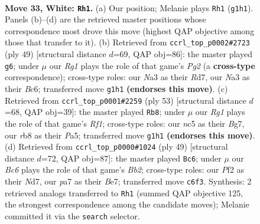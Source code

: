 \documentclass[11pt]{article}
\begin{document}
\clearpage

\begin{figure}[p]\centering
\begin{subfigure}{0.46\textwidth}\centering
\resizebox{\linewidth}{!}{%
\newchessgame
\chessboard[
  setfen={1r3r2/p4p1k/bpB1p1pp/2n5/2P5/N1B1P2P/PR3PP1/5KR1 w - - 11 33},
  showmover=false,
  pgfstyle=straightmove, color=movearrow, markmove={g1-h1}
]}
\caption{}
\end{subfigure}\hfill
\begin{subfigure}{0.46\textwidth}\centering
\resizebox{\linewidth}{!}{%
\newchessgame
\chessboard[
  setfen={1r3k2/3r1pp1/2b2n2/p1pp3p/5P1P/P1N1P3/1P1R1PB1/2R3K1 b - - 1 25},
  showmover=false,
  pgfstyle=straightmove, color=movearrow, markmove={g7-g6}
]}
\caption{}
\end{subfigure}
\\[4pt]
\begin{subfigure}{0.46\textwidth}\centering
\resizebox{\linewidth}{!}{%
\newchessgame
\chessboard[
  setfen={5rk1/4ppbp/6p1/pN1n4/P2P3P/BR4P1/4rPK1/2R5 b - - 1 27},
  showmover=false,
  pgfstyle=straightmove, color=movearrow, markmove={f8-b8}
]}
\caption{}
\end{subfigure}\hfill
\begin{subfigure}{0.46\textwidth}\centering
\resizebox{\linewidth}{!}{%
\newchessgame
\chessboard[
  setfen={r7/1b1nbpkp/4p1p1/p2p4/1r1P4/2N1P1P1/1P2BP1P/RR2N1K1 b - - 1 25},
  showmover=false,
  pgfstyle=straightmove, color=movearrow, markmove={b7-c6}
]}
\caption{}
\end{subfigure}
\caption{\textbf{Move 33, White: \texttt{Rh1}.} (a) Our position; Melanie plays \texttt{Rh1} (\texttt{g1h1}). Panels (b)--(d) are the retrieved master positions whose correspondence most drove this move (highest QAP objective among those that transfer to it). (b) Retrieved from \texttt{ccrl\_top\_p0002\#2723} (ply 49) [structural distance $d$=69, QAP obj=86]: the master played \texttt{g6}; under $\mu$ our \emph{Rg1} plays the role of that game's \emph{Pg2} (a \textbf{cross-type} correspondence); cross-type roles: our \emph{N}a3 as their \emph{R}d7, our \emph{N}a3 as their \emph{B}c6; transferred move \texttt{g1h1} \textbf{(endorses this move)}. (c) Retrieved from \texttt{ccrl\_top\_p0001\#2259} (ply 53) [structural distance $d$=68, QAP obj=39]: the master played \texttt{Rb8}; under $\mu$ our \emph{Rg1} plays the role of that game's \emph{Rf1}; cross-type roles: our \emph{n}c5 as their \emph{B}g7, our \emph{r}b8 as their \emph{P}a5; transferred move \texttt{g1h1} \textbf{(endorses this move)}. (d) Retrieved from \texttt{ccrl\_top\_p0000\#1024} (ply 49) [structural distance $d$=72, QAP obj=87]: the master played \texttt{Bc6}; under $\mu$ our \emph{Bc6} plays the role of that game's \emph{Bb2}; cross-type roles: our \emph{P}f2 as their \emph{N}d7, our \emph{p}a7 as their \emph{B}e7; transferred move \texttt{c6f3}. Synthesis: 2 retrieved analogs transferred to \texttt{Rh1} (summed QAP objective 125, the strongest correspondence among the candidate moves); Melanie committed it via the \texttt{search} selector.}
\label{fig:thought-m64}
\end{figure}
\end{document}
